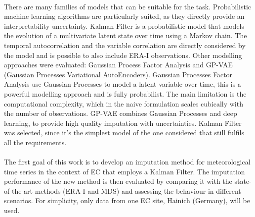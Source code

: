 \documentclass{article}
\begin{document}
\paragraph{} There are many families of models that can be suitable for the task. Probabilistic machine learning algorithms are particularly suited, as they directly provide an interpretability uncertainty.
Kalman Filter is a probabilistic model that models the evolution of a multivariate latent state over time using a Markov chain. The temporal autocorrelation and the variable correlation are directly considered by the model and is possible to also include ERA-I observations.
Other modelling approaches were evaluated: Gaussian Process Factor Analysis and GP-VAE (Gaussian Processes Variational AutoEncoders). Gaussian Processes Factor Analysis \cite{yu_gaussian-process_2008} use Gaussian Processes to model a latent variable over time, this is a powerful modelling approach and is fully probabilist. The main limitation is the computational complexity, which in the naive formulation scales cubically with the number of observations.
GP-VAE \cite{fortuin_gp-vae_2020} combines Gaussian Processes and deep learning, to provide high quality imputation with uncertainties.
Kalman Filter was selected, since it's the simplest model of the one considered that still fulfils all the requirements.

\paragraph{} The first goal of this work is to develop an imputation method for meteorological time series in the context of EC that employs a Kalman Filter. The imputation performance of the new method is then evaluated by comparing it with the state-of-the-art methods (ERA-I and MDS) and assessing the behaviour in different scenarios. For simplicity, only data from one EC site, Hainich (Germany), will be used.
\end{document}
